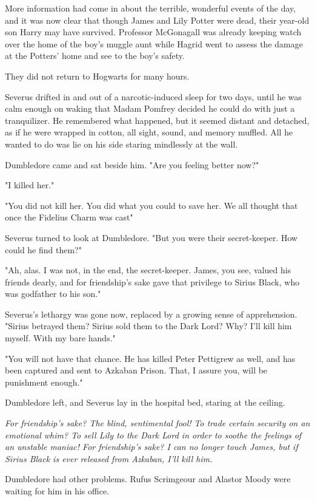 More information had come in about the terrible, wonderful events of the day, and it was now clear that though James and Lily Potter were dead, their year-old son Harry may have survived. Professor McGonagall was already keeping watch over the home of the boy's muggle aunt while Hagrid went to assess the damage at the Potters' home and see to the boy's safety.

They did not return to Hogwarts for many hours.

Severus drifted in and out of a narcotic-induced sleep for two days, until he was calm enough on waking that Madam Pomfrey decided he could do with just a tranquilizer. He remembered what happened, but it seemed distant and detached, as if he were wrapped in cotton, all sight, sound, and memory muffled. All he wanted to do was lie on his side staring mindlessly at the wall.

Dumbledore came and sat beside him. "Are you feeling better now?"

"I killed her."

"You did not kill her. You did what you could to save her. We all thought that once the Fidelius Charm was cast{\el}"

Severus turned to look at Dumbledore. "But you were their secret-keeper. How could he find them?"

"Ah, alas. I was not, in the end, the secret-keeper. James, you see, valued his friends dearly, and for friendship's sake gave that privilege to Sirius Black, who was godfather to his son."

Severus's lethargy was gone now, replaced by a growing sense of apprehension. "Sirius betrayed them? Sirius sold them to the Dark Lord? Why? I'll kill him myself. With my bare hands."

"You will not have that chance. He has killed Peter Pettigrew as well, and has been captured and sent to Azkaban Prison. That, I assure you, will be punishment enough."

Dumbledore left, and Severus lay in the hospital bed, staring at the ceiling.

\emph{For friendship's sake? The blind, sentimental fool! To trade certain security on an emotional whim? To sell Lily to the Dark Lord in order to soothe the feelings of an unstable maniac! For friendship's sake? I can no longer touch James, but if Sirius Black is ever released from Azkaban, I'll kill him.}

Dumbledore had other problems. Rufus Scrimgeour and Alastor Moody were waiting for him in his office.

